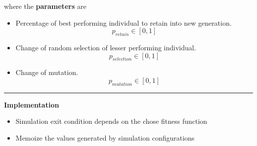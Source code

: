 where the \textbf{parameters} are

\begin{itemize}
\tightlist
\item
  Percentage of best performing individual to retain into new
  generation. \[ p_{retain} \in [0, 1] \]
\item
  Change of random selection of lesser performing individual.
  \[ p_{selection} \in [0, 1] \]
\item
  Change of mutation. \[ p_{mutation} \in [0, 1] \]
\end{itemize}

\begin{center}\rule{0.5\linewidth}{\linethickness}\end{center}

\textbf{Implementation}

\begin{itemize}
\tightlist
\item
  Simulation exit condition depends on the chose fitness function
\item
  Memoize the values generated by simulation configurations
\end{itemize}

